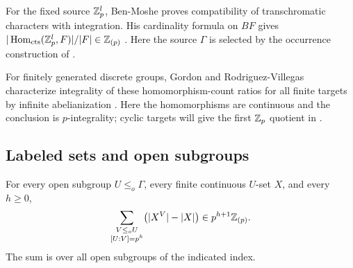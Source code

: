 For the fixed source $\mathbb Z_p^l$, Ben-Moshe proves compatibility of
transchromatic characters with integration.  His cardinality formula on
$BF$ gives
$|\operatorname{Hom}_{\mathrm{cts}}(\mathbb Z_p^l,F)|/|F|\in\mathbb Z_{(p)}$
\cite[Theorems~5.7 and~5.8]{BenMoshe}.
Here the source $\Gamma$ is selected by the occurrence construction of
.

For finitely generated discrete groups, Gordon and Rodriguez-Villegas
characterize integrality of these homomorphism-count ratios for all finite
targets by infinite abelianization \cite[Corollary~3.3]{GRV}.
Here the homomorphisms are continuous and the conclusion is $p$-integrality;
cyclic targets will give the first $\mathbb Z_p$ quotient in .

\subsection{Labeled sets and open subgroups}

\begin{theorem}\label{thm:subgroup-congruence}
For every open subgroup $U\le_o\Gamma$, every finite continuous $U$-set
$X$, and every $h\geq0$,
\begin{equation}\label{eq:subgroup-congruence}
 \sum_{\substack{V\le_o U\\{}[U:V]=p^h}}
       \bigl(|X^V|-|X|\bigr)
       \in p^{h+1}\mathbb Z_{(p)}.
\end{equation}
The sum is over all open subgroups of the indicated index.
\end{theorem}

